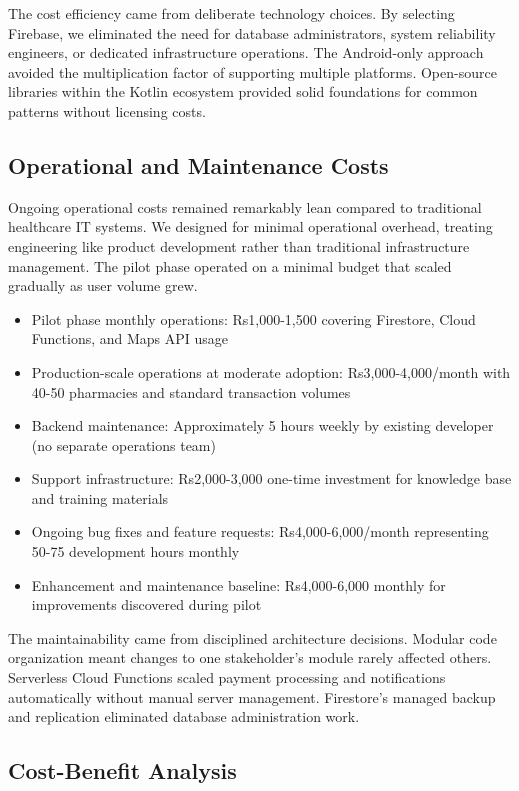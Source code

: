 \documentclass[12pt,a4paper]{report}
\begin{document}
The cost efficiency came from deliberate technology choices. By selecting Firebase, we eliminated the need for database administrators, system reliability engineers, or dedicated infrastructure operations. The Android-only approach avoided the multiplication factor of supporting multiple platforms. Open-source libraries within the Kotlin ecosystem provided solid foundations for common patterns without licensing costs.

\subsection{Operational and Maintenance Costs}

Ongoing operational costs remained remarkably lean compared to traditional healthcare IT systems. We designed for minimal operational overhead, treating engineering like product development rather than traditional infrastructure management. The pilot phase operated on a minimal budget that scaled gradually as user volume grew.

\begin{itemize}
  \item Pilot phase monthly operations: Rs1,000-1,500 covering Firestore, Cloud Functions, and Maps API usage
  \item Production-scale operations at moderate adoption: Rs3,000-4,000/month with 40-50 pharmacies and standard transaction volumes
  \item Backend maintenance: Approximately 5 hours weekly by existing developer (no separate operations team)
  \item Support infrastructure: Rs2,000-3,000 one-time investment for knowledge base and training materials
  \item Ongoing bug fixes and feature requests: Rs4,000-6,000/month representing 50-75 development hours monthly
  \item Enhancement and maintenance baseline: Rs4,000-6,000 monthly for improvements discovered during pilot
\end{itemize}

The maintainability came from disciplined architecture decisions. Modular code organization meant changes to one stakeholder's module rarely affected others. Serverless Cloud Functions scaled payment processing and notifications automatically without manual server management. Firestore's managed backup and replication eliminated database administration work.

\subsection{Cost-Benefit Analysis}
\end{document}
